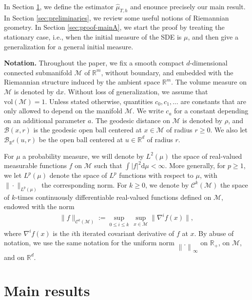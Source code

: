 \documentclass[10pt,a4paper]{article}
\newcommand{\R}{{\mathbb R}}
\newcommand{\vol}{ \mathrm{vol}}
\newcommand\cB{\mathcal{B}}
\newcommand\cC{\mathcal{C}}
\newcommand\cM{\mathcal{M}}
\newcommand\dR{\mathbb{R}}
\newcommand\dd{\mathrm{d}}
\newcommand{\ABS}[1]{{{\left| #1 \right|}}} %
\newcommand{\NRM}[1]{{{\left\| #1\right\|}}} %
\let \ssection=\section
\renewcommand{\section}{\setcounter{equation}{0}\ssection}
\begin{document}
In Section \ref{sec:main-results}, we define the estimator $\widehat{\mu}_{T,h}$ and enounce precisely our main result. In Section \ref{sec:preliminaries}, we review some useful notions of Riemannian geometry. In Section \ref{sec:proof-mainA}, we start the proof by treating the stationary case, i.e., when the initial measure of the SDE is $\mu$, and then give a generalization for a general initial measure. 







\medskip

\textbf{Notation.} Throughout the paper, we fix  a smooth compact $d$-dimensional connected submanifold $\cM$ of $\mathbb{R}^m$,  without boundary, and embedded with the Riemannian structure induced by the ambient space $\mathbb{R}^m$. The volume measure on $\cM$ is denoted by $\dd x$. Without loss of generalization, we assume that $\vol(\cM)=1$. Unless stated otherwise, quantities $c_0,c_1,\dots$ are  constants that are only allowed to depend on the manifold $\cM$. We write $c_a$ for a constant depending on an additional parameter $a$. The geodesic distance on $\cM$ is denoted by $\rho$, and $\cB(x,r)$ is the geodesic open ball centered at $x\in \cM$ of radius $r\ge 0$. We also let $\cB_{\R^d}(u,r)$ be the open ball centered at $u\in \R^d$ of radius $r$.

For $\mu$ a probability measure, we will denote by $L^2(\mu)$ the space of real-valued measurable functions $f$ on $\cM$ such that $\int\ABS{f}^2\dd \mu<\infty$. More generally, for $p\ge 1$,  we let $L^p(\mu)$ denote the space of $L^p$ functions with respect to $\mu$,  with $\|\cdot\|_{L^p(\mu)}$ the corresponding norm. For $k\ge 0$, we denote by $\cC^k(\cM)$ the space of $k$-times continuously differentiable real-valued functions defined on $\cM$, endowed with the norm
 \begin{align}\label{eq:holder-norm}
 \|f\|_{\cC^k(\cM)}:= \sup_{0\le i\le k}\, \sup_{x\in \cM} \|\nabla^i f(x)\|, 
 \end{align}
where $\nabla^i f(x)$ is the $i$th iterated covariant derivative of $f$ at $x$. By abuse of notation, we use the same notation for the uniform norm $\NRM{.}_\infty$ on $\dR_+$, on $\cM$, and on $\dR^d$.

\section{Main results}\label{sec:main-results}
\end{document}
